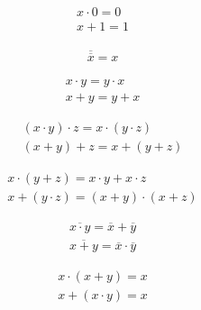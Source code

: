 \begin{tcolorbox}
	\begin{align}
		x \cdot 0 = 0 \\
		x + 1 = 1
	\end{align}
\end{tcolorbox}

\begin{tcolorbox}
	\begin{align}
		\overline {\overline x} = x
	\end{align}
\end{tcolorbox}

\begin{tcolorbox}
	\begin{align}
		x \cdot y = y \cdot x \\
		x + y = y + x
	\end{align}
\end{tcolorbox}

\begin{tcolorbox}
	\begin{align}
		(x \cdot y) \cdot z = x \cdot (y \cdot z) \\
		(x + y) + z = x + (y + z)
	\end{align}
\end{tcolorbox}

\begin{tcolorbox}
	\begin{align}
		x \cdot (y + z) = x \cdot y + x \cdot z \\
		x + (y \cdot z) = (x + y) \cdot (x + z)
	\end{align}
\end{tcolorbox}

\begin{tcolorbox}
	\begin{align}
		\overline{x \cdot y} = \overline x + \overline y \\
		\overline{x + y} = \overline x \cdot \overline y
	\end{align}
\end{tcolorbox}

\begin{tcolorbox}
	\begin{align}
		x \cdot (x + y) = x \\
		x + (x \cdot y) = x
	\end{align}
\end{tcolorbox}


